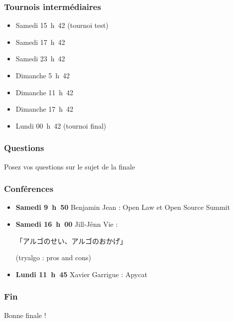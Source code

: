 \documentclass{beamer}
\begin{document}
\begin{frame}
    \frametitle{Tournois intermédiaires}
    \begin{itemize}
        \item Samedi 15~h~42 (tournoi test)
        \item Samedi 17~h~42
        \item Samedi 23~h~42
        \item Dimanche 5~h~42
        \item Dimanche 11~h~42
        \item Dimanche 17~h~42
        \item Lundi 00~h~42 (tournoi final)
    \end{itemize}
\end{frame}

\begin{frame}
    \frametitle{Questions}
    Posez vos questions sur le sujet de la finale
\end{frame}

\begin{frame}
    \frametitle{Conférences}
    \begin{itemize}
        \item \textbf{Samedi 9~h~50} Benjamin Jean : Open Law et Open Source Summit
        \item \textbf{Samedi 16~h~00} Jill-Jênn Vie : \begin{CJK}{UTF8}{min}「アルゴのせい、アルゴのおかげ」\end{CJK} (tryalgo : pros and cons)
        \item \textbf{Lundi 11~h~45} Xavier Garrigue : Apycat
    \end{itemize}
\end{frame}

\begin{frame}
    \frametitle{Fin}
    Bonne finale !
\end{frame}
\end{document}
